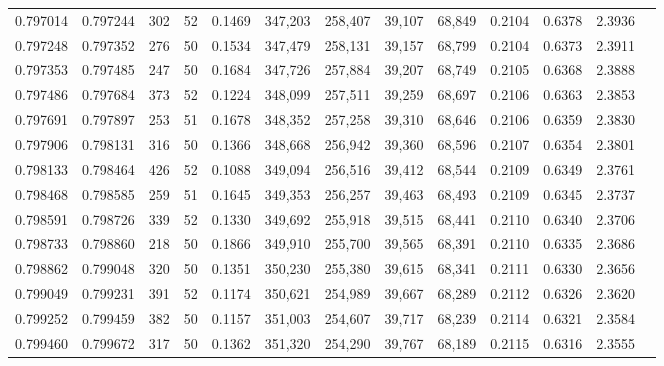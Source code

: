 \begin{tabular}{rrrrrrrrrrrrr}
0.797014 & 0.797244 &   302 &  52 &                                     0.1469 & 347,203 & 258,407 &  39,107 &  68,849 & 0.2104 & 0.6378 & 2.3936 \\
0.797248 & 0.797352 &   276 &  50 &                                     0.1534 & 347,479 & 258,131 &  39,157 &  68,799 & 0.2104 & 0.6373 & 2.3911 \\
0.797353 & 0.797485 &   247 &  50 &                                     0.1684 & 347,726 & 257,884 &  39,207 &  68,749 & 0.2105 & 0.6368 & 2.3888 \\
0.797486 & 0.797684 &   373 &  52 &                                     0.1224 & 348,099 & 257,511 &  39,259 &  68,697 & 0.2106 & 0.6363 & 2.3853 \\
0.797691 & 0.797897 &   253 &  51 &                                     0.1678 & 348,352 & 257,258 &  39,310 &  68,646 & 0.2106 & 0.6359 & 2.3830 \\
0.797906 & 0.798131 &   316 &  50 &                                     0.1366 & 348,668 & 256,942 &  39,360 &  68,596 & 0.2107 & 0.6354 & 2.3801 \\
0.798133 & 0.798464 &   426 &  52 &                                     0.1088 & 349,094 & 256,516 &  39,412 &  68,544 & 0.2109 & 0.6349 & 2.3761 \\
0.798468 & 0.798585 &   259 &  51 &                                     0.1645 & 349,353 & 256,257 &  39,463 &  68,493 & 0.2109 & 0.6345 & 2.3737 \\
0.798591 & 0.798726 &   339 &  52 &                                     0.1330 & 349,692 & 255,918 &  39,515 &  68,441 & 0.2110 & 0.6340 & 2.3706 \\
0.798733 & 0.798860 &   218 &  50 &                                     0.1866 & 349,910 & 255,700 &  39,565 &  68,391 & 0.2110 & 0.6335 & 2.3686 \\
0.798862 & 0.799048 &   320 &  50 &                                     0.1351 & 350,230 & 255,380 &  39,615 &  68,341 & 0.2111 & 0.6330 & 2.3656 \\
0.799049 & 0.799231 &   391 &  52 &                                     0.1174 & 350,621 & 254,989 &  39,667 &  68,289 & 0.2112 & 0.6326 & 2.3620 \\
0.799252 & 0.799459 &   382 &  50 &                                     0.1157 & 351,003 & 254,607 &  39,717 &  68,239 & 0.2114 & 0.6321 & 2.3584 \\
0.799460 & 0.799672 &   317 &  50 &                                     0.1362 & 351,320 & 254,290 &  39,767 &  68,189 & 0.2115 & 0.6316 & 2.3555 \\

\end{tabular}
